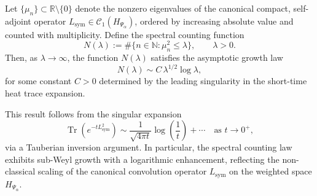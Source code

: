 \begin{proposition}
\label{prop:spectral_counting_weyl}
Let \( \{ \mu_n \} \subset \mathbb{R} \setminus \{0\} \) denote the nonzero eigenvalues of the canonical compact, self-adjoint operator \( L_{\mathrm{sym}} \in \mathcal{C}_1(H_{\Psi_\alpha}) \), ordered by increasing absolute value and counted with multiplicity. Define the spectral counting function
\[
N(\lambda) := \#\{ n \in \mathbb{N} : \mu_n^2 \leq \lambda \}, \qquad \lambda > 0.
\]
Then, as \( \lambda \to \infty \), the function \( N(\lambda) \) satisfies the asymptotic growth law
\[
N(\lambda) \sim C\, \lambda^{1/2} \log \lambda,
\]
for some constant \( C > 0 \) determined by the leading singularity in the short-time heat trace expansion.

\medskip
\noindent
This result follows from the singular expansion
\[
\operatorname{Tr}(e^{-t L_{\mathrm{sym}}^2}) \sim \frac{1}{\sqrt{4\pi t}} \log\left( \frac{1}{t} \right) + \cdots \quad \text{as } t \to 0^+,
\]
via a Tauberian inversion argument. In particular, the spectral counting law exhibits sub-Weyl growth with a logarithmic enhancement, reflecting the non-classical scaling of the canonical convolution operator \( L_{\mathrm{sym}} \) on the weighted space \( H_{\Psi_\alpha} \).
\end{proposition}
